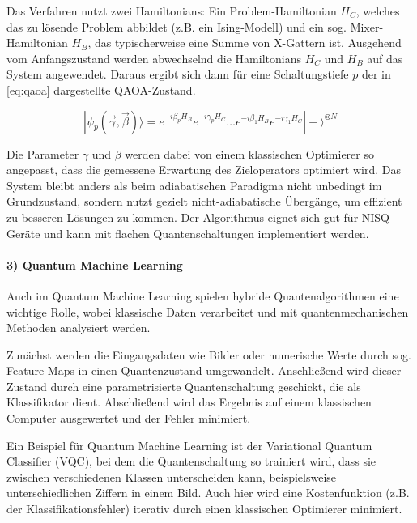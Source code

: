 Das Verfahren nutzt zwei Hamiltonians: Ein Problem-Hamiltonian $H_C$, welches das zu lösende Problem abbildet (z.B. ein Ising-Modell) und ein sog. Mixer-Hamiltonian $H_B$, das typischerweise eine Summe von X-Gattern ist. Ausgehend vom Anfangszustand werden abwechselnd die Hamiltonians $H_C$ und $H_B$ auf das System angewendet. Daraus ergibt sich dann für eine Schaltungstiefe $p$ der in \autoref{eq:qaoa} dargestellte QAOA-Zustand. \autocite[3]{zhou_quantum_2020}

\begin{equation}
    |\psi_p(\vec{\gamma}, \vec{\beta})\rangle = e^{-i\beta_p H_B}e^{-i\gamma_p H_C} \dots e^{-i\beta_1 H_B}e^{-i\gamma_1 H_C} |+\rangle^{\otimes N}
\label{eq:qaoa}
\end{equation}

Die Parameter $\gamma$ und $\beta$ werden dabei von einem klassischen Optimierer so angepasst, dass die gemessene Erwartung des Zieloperators optimiert wird. Das System bleibt anders als beim adiabatischen Paradigma nicht unbedingt im Grundzustand, sondern nutzt gezielt nicht-adiabatische Übergänge, um effizient zu besseren Lösungen zu kommen. Der Algorithmus eignet sich gut für NISQ-Geräte und kann mit flachen Quantenschaltungen implementiert werden. \autocite[2-9]{zhou_quantum_2020}
\\

\paragraph{3) Quantum Machine Learning}
Auch im Quantum Machine Learning spielen hybride Quantenalgorithmen eine wichtige Rolle, wobei klassische Daten verarbeitet und mit quantenmechanischen Methoden analysiert werden.

Zunächst werden die Eingangsdaten wie Bilder oder numerische Werte durch sog. Feature Maps in einen Quantenzustand umgewandelt. Anschließend wird dieser Zustand durch eine parametrisierte Quantenschaltung geschickt, die als Klassifikator dient. Abschließend wird das Ergebnis auf einem klassischen Computer ausgewertet und der Fehler minimiert.

Ein Beispiel für Quantum Machine Learning ist der Variational Quantum Classifier (VQC), bei dem die Quantenschaltung so trainiert wird, dass sie zwischen verschiedenen Klassen unterscheiden kann, beispielsweise unterschiedlichen Ziffern in einem Bild. Auch hier wird eine Kostenfunktion (z.B. der Klassifikationsfehler) iterativ durch einen klassischen Optimierer minimiert. 

